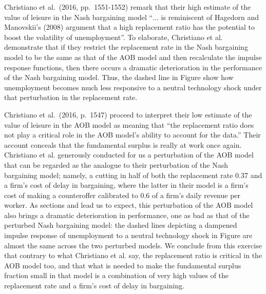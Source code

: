  Christiano et al.\ (2016, pp.~1551-1552) remark that
   their high estimate of the value of leisure in the
Nash bargaining model ``$\ldots$  is reminiscent of Hagedorn
and Manovskii's (2008) argument that a high replacement ratio has
the potential to boost the volatility of unemployment''.
To elaborate, Christiano et al. demonstrate  that if they restrict the replacement
rate in the Nash bargaining model to be the same as that of the
AOB model and then recalculate the impulse response functions, then there occurs
a dramatic deterioration in the performance of the Nash
bargaining model. Thus,  the dashed line in Figure 
show how  unemployment becomes much less responsive to
a neutral technology shock under that perturbation in the replacement rate.

Christiano et al.\ (2016, p.~1547) proceed to interpret  their low estimate of the value of leisure in the
AOB model as meaning that ``the replacement ratio does not play a critical role
in the AOB model's ability to account for the data.''
Their account conceals that the fundamental surplus  is really at work once
again. Christiano et al.
 generously conducted for us
a perturbation of the AOB model that can be regarded as the
analogue to their perturbation of the Nash bargaining model;
namely, a cutting in half
of both the replacement rate 0.37 and a firm's cost of delay
in bargaining, where the latter in their model is a firm's
cost of  making a counteroffer  calibrated to 0.6 of a firm's
daily revenue per worker.
As  sections
 and  lead us to expect, this
perturbation of the AOB model also brings a dramatic
deterioration in performance, one as bad as that of the perturbed Nash
bargaining model: the dashed lines depicting a
dampened impulse response of unemployment to a neutral
technology shock in Figure  
are
almost the same
across the two perturbed models.
We conclude from this exercise that contrary to what Christiano et al. say,  the replacement ratio is  critical
in the AOB model too, and that  what is needed to make the fundamental surplus fraction small
in that model
is a combination of very high
values of the replacement rate and a firm's cost of delay in
bargaining.









